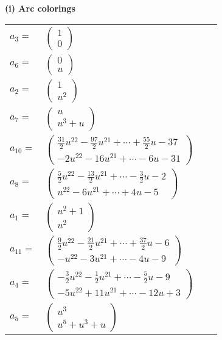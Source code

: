 \documentclass[1p]{elsarticle_modified}
\theoremstyle{definition}
\begin{document}
\flushleft \textbf{(i) Arc colorings}\\
\begin{tabular}{m{7pt} m{180pt} m{7pt} m{180pt} }
\flushright $a_{3}=$&$\begin{pmatrix}1\\0\end{pmatrix}$ \\
\flushright $a_{6}=$&$\begin{pmatrix}0\\u\end{pmatrix}$ \\
\flushright $a_{2}=$&$\begin{pmatrix}1\\u^2\end{pmatrix}$ \\
\flushright $a_{7}=$&$\begin{pmatrix}u\\u^3+u\end{pmatrix}$ \\
\flushright $a_{10}=$&$\begin{pmatrix}\frac{31}{2} u^{22}-\frac{97}{2} u^{21}+\cdots+\frac{55}{2} u-37\\-2 u^{22}-16 u^{21}+\cdots-6 u-31\end{pmatrix}$ \\
\flushright $a_{8}=$&$\begin{pmatrix}\frac{5}{2} u^{22}-\frac{13}{2} u^{21}+\cdots-\frac{3}{2} u-2\\u^{22}-6 u^{21}+\cdots+4 u-5\end{pmatrix}$ \\
\flushright $a_{1}=$&$\begin{pmatrix}u^2+1\\u^2\end{pmatrix}$ \\
\flushright $a_{11}=$&$\begin{pmatrix}\frac{9}{2} u^{22}-\frac{21}{2} u^{21}+\cdots+\frac{37}{2} u-6\\- u^{22}-3 u^{21}+\cdots-4 u-9\end{pmatrix}$ \\
\flushright $a_{4}=$&$\begin{pmatrix}-\frac{3}{2} u^{22}-\frac{1}{2} u^{21}+\cdots-\frac{5}{2} u-9\\-5 u^{22}+11 u^{21}+\cdots-12 u+3\end{pmatrix}$ \\
\flushright $a_{5}=$&$\begin{pmatrix}u^3\\u^5+u^3+u\end{pmatrix}$ \\

\end{tabular}
\end{document}
